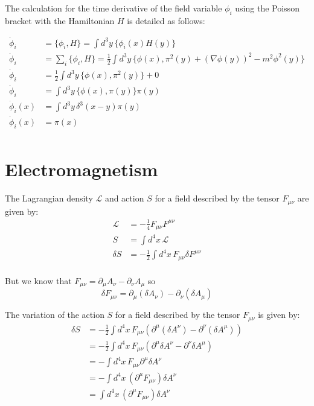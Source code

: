 \documentclass{article}
\begin{document}
The calculation for the time derivative of the field variable \(\phi_i\) using the Poisson bracket with the Hamiltonian \(H\) is detailed as follows:

\begin{align*}
    \dot{\phi}_i &= \{\phi_i, H\} = \int d^3y \, \{ \phi_i(x) H(y) \} \\ 
    \dot{\phi}_i &= \sum_i \{\phi_i, H\} = \frac{1}{2} \int d^3y \, \{\phi(x), \pi^2(y) + (\nabla \phi(y))^2 - m^2 \phi^2(y)\} \\ 
    \dot{\phi}_i &= \frac{1}{2} \int d^3y \, \{\phi(x), \pi^2(y)\} + 0 \\ 
    \dot{\phi}_i &= \int d^3y \, \{\phi(x), \pi(y)\} \pi(y) \\ 
    \dot{\phi}_i(x) &= \int d^3y \, \delta^3(x-y) \pi(y) \\ 
    \dot{\phi}_i(x) &= \pi(x) \\ 
\end{align*}

\section*{Electromagnetism}

The Lagrangian density \(\mathcal{L}\) and action \(S\) for a field described by the tensor \(F_{\mu\nu}\) are given by:
\begin{align*}
    \mathcal{L} &= -\frac{1}{4} F_{\mu\nu} F^{\mu\nu} \\
    S &= \int d^4x \, \mathcal{L} \\
    \delta S &= - \frac{1}{2} \int d^4x \,  F_{\mu\nu} \delta F^{\mu\nu} \\ 
\end{align*}

But we know that \( F_{\mu \nu} = \partial_\mu A_\nu - \partial_\nu A_\mu  \)
so 
\[ \delta F_{\mu \nu} = \partial_\mu(\delta A_\nu) - \partial_\nu( \delta A_\mu) \]

The variation of the action \(S\) for a field described by the tensor \(F_{\mu\nu}\) is given by:
\begin{align*}
    \delta S &= - \frac{1}{2} \int d^4 x \, F_{\mu \nu}  \left( \partial^\mu (\delta A^\nu) - \partial^\nu (\delta A^\mu) \right) \\
    &= - \frac{1}{2} \int d^4 x \, F_{\mu \nu} \left( \partial^\mu \delta A^\nu - \partial^\nu \delta A^\mu \right) \\
    &= - \int d^4 x \, F_{\mu \nu} \partial^\mu \delta A^\nu \\
    &= - \int d^4 x \, \left( \partial^\mu F_{\mu \nu} \right) \delta A^\nu \\ 
    &= \int d^4 x \, \left( \partial^\mu F_{\mu \nu} \right) \delta A^\nu  \\
\end{align*}
\end{document}
